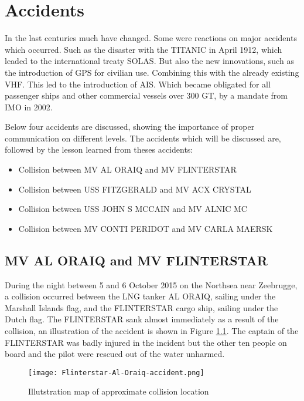 \chapter{Accidents}
In the last centuries much have changed. Some were reactions on major accidents which occurred. Such as the disaster with the TITANIC in April 1912, which leaded to the international treaty \ac{SOLAS}. But also the new innovations, such as the introduction of \ac{GPS} for civilian use. Combining this with the already existing \ac{VHF}. This led to the introduction of \ac{AIS}. Which became obligated for all passenger ships and other commercial vessels over 300 \ac{GT}, by a mandate from \ac{IMO} in 2002.

Below four accidents are discussed, showing the importance of proper communication on different levels. The accidents which will be discussed are, followed by the lesson learned from theses accidents:
\begin{itemize}
	\item Collision between MV AL ORAIQ and MV FLINTERSTAR
	\item Collision between USS FITZGERALD and MV ACX CRYSTAL
	\item Collision between USS JOHN S MCCAIN and MV ALNIC MC
	\item Collision between MV CONTI PERIDOT and MV CARLA MAERSK
\end{itemize}

\newpage
\section{MV AL ORAIQ and MV FLINTERSTAR}
\label{sec:al-oraiq-vs-flinterstar}
During the night between 5 and 6 October 2015 on the Northsea near Zeebrugge, a collision occurred between the LNG tanker AL ORAIQ, sailing under the Marshall Islands flag, and the FLINTERSTAR cargo ship, sailing under the Dutch flag. The FLINTERSTAR sank almost immediately as a result of the collision, an illustration of the accident is shown in Figure \ref{fig:Accident-Flinterstar-Al-Oraiq}. The captain of the FLINTERSTAR was badly injured in the incident but the other ten people on board and the pilot were rescued out of the water unharmed.

\begin{figure}[H]
	\centering
	\texttt{[image: Flinterstar-Al-Oraiq-accident.png]}
	\caption{Illutstration map of approximate collision location}
	\label{fig:Accident-Flinterstar-Al-Oraiq}
\end{figure}


